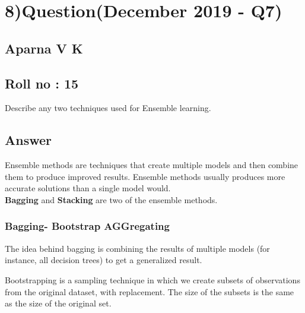 \section*{8)Question(December 2019 - Q7)}
    \subsection*{\large Aparna V K}
    \subsection*{Roll no : 15}
Describe any two techniques used for Ensemble learning.
\subsection*{Answer}
Ensemble methods are techniques that create multiple models and then combine them to produce improved results. Ensemble methods usually produces more accurate solutions than a single model would. 
\\ \textbf{Bagging} and \textbf{Stacking} are two of the ensemble methods. 
\subsubsection*{Bagging- \textbf{B}ootstrap \textbf{AGG}regating}
The idea behind bagging is combining the results of multiple models (for instance, all decision trees) to get a generalized result.

Bootstrapping is a sampling technique in which we create subsets of observations from the original dataset, with replacement. The size of the subsets is the same as the size of the original set.

